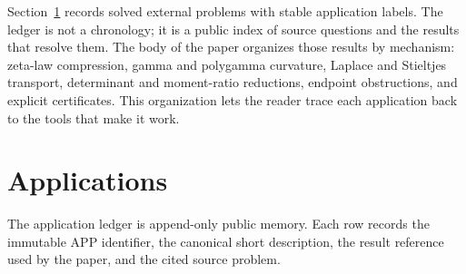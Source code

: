 \documentclass[11pt]{article}
\numberwithin{equation}{section}
\theoremstyle{definition}
\theoremstyle{remark}
\newcommand{\1}{\mathbf 1}
\begin{document}
Section~\ref{sec:applications} records solved external problems with stable
application labels.  The ledger is not a chronology; it is a public index of
source questions and the results that resolve them.  The body of the paper
organizes those results by mechanism: zeta-law compression, gamma and
polygamma curvature, Laplace and Stieltjes transport, determinant and
moment-ratio reductions, endpoint obstructions, and explicit certificates.
This organization lets the reader trace each application back to the tools
that make it work.

\section{Applications}
\label{sec:applications}
The application ledger is append-only public memory.  Each row records the immutable APP identifier, the canonical short description, the result reference used by the paper, and the cited source problem.
\end{document}
